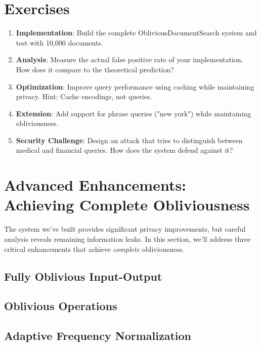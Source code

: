 \section{Exercises}

\begin{enumerate}
\item \textbf{Implementation}: Build the complete ObliviousDocumentSearch system and test with 10,000 documents.

\item \textbf{Analysis}: Measure the actual false positive rate of your implementation. How does it compare to the theoretical prediction?

\item \textbf{Optimization}: Improve query performance using caching while maintaining privacy. Hint: Cache encodings, not queries.

\item \textbf{Extension}: Add support for phrase queries ("new york") while maintaining obliviousness.

\item \textbf{Security Challenge}: Design an attack that tries to distinguish between medical and financial queries. How does the system defend against it?
\end{enumerate}

\section{Advanced Enhancements: Achieving Complete Obliviousness}

The system we've built provides significant privacy improvements, but careful analysis reveals remaining information leaks. In this section, we'll address three critical enhancements that achieve \textit{complete} obliviousness.

\subsection{Fully Oblivious Input-Output}



\subsection{Oblivious Operations} 



\subsection{Adaptive Frequency Normalization}

